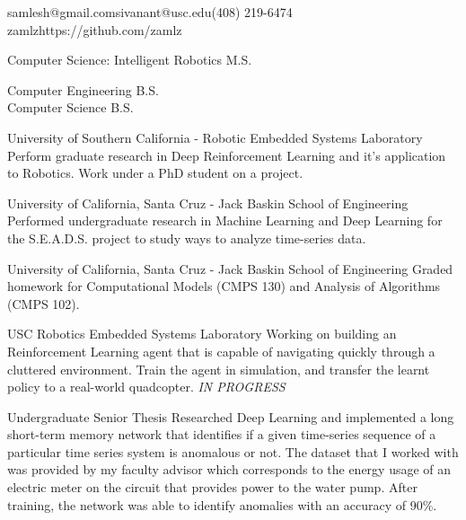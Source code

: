 \documentclass{resume}
\begin{document}
{samlesh@gmail.com}{sivanant@usc.edu}{(408) 219-6474}
{zamlz}{https://github.com/zamlz}


Computer Science: Intelligent Robotics M.S.

Computer Engineering B.S. \\ Computer Science B.S.


{University of Southern California - Robotic Embedded Systems Laboratory}
{Perform graduate research in Deep Reinforcement Learning and it's application
to Robotics. Work under a PhD student on a project.}

{University of California, Santa Cruz - Jack Baskin School of Engineering}
{Performed undergraduate research in Machine Learning and Deep Learning 
for the S.E.A.D.S. project to study ways to analyze time-series data.}

{University of California, Santa Cruz - Jack Baskin School of Engineering}
{Graded homework for Computational Models (CMPS 130) and Analysis of 
Algorithms (CMPS 102).}


{USC Robotics Embedded Systems Laboratory}
{Working on building an Reinforcement Learning agent that is capable of
navigating quickly through a cluttered environment. Train the agent in
simulation, and transfer the learnt policy to a real-world quadcopter.
\textit{IN PROGRESS}}

{Undergraduate Senior Thesis}
{Researched Deep Learning and implemented a long short-term memory
network that identifies if a given time-series sequence of a particular
time series system is anomalous or not. The dataset that I worked with
was provided by my faculty advisor which corresponds to the energy usage
of an electric meter on the circuit that provides power to the water
pump. After training, the network was able to identify anomalies with
an accuracy of 90\%.}
\end{document}
